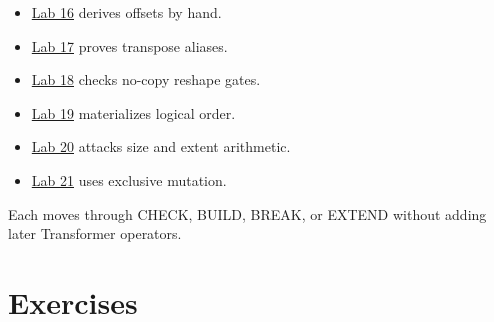 \begin{itemize}
\tightlist
\item
  \href{https://github.com/hermonai/inside-the-llm-engine/blob/astra-visual-rewrite/labs/lab-16-offset-by-hand.md}{Lab
  16} derives offsets by hand.
\item
  \href{https://github.com/hermonai/inside-the-llm-engine/blob/astra-visual-rewrite/labs/lab-17-transpose-without-copy.md}{Lab
  17} proves transpose aliases.
\item
  \href{https://github.com/hermonai/inside-the-llm-engine/blob/astra-visual-rewrite/labs/lab-18-reshape-view.md}{Lab
  18} checks no-copy reshape gates.
\item
  \href{https://github.com/hermonai/inside-the-llm-engine/blob/astra-visual-rewrite/labs/lab-19-non-contiguous-copy.md}{Lab
  19} materializes logical order.
\item
  \href{https://github.com/hermonai/inside-the-llm-engine/blob/astra-visual-rewrite/labs/lab-20-break-shape-arithmetic.md}{Lab
  20} attacks size and extent arithmetic.
\item
  \href{https://github.com/hermonai/inside-the-llm-engine/blob/astra-visual-rewrite/labs/lab-21-mutation-and-aliasing.md}{Lab
  21} uses exclusive mutation.
\end{itemize}

Each moves through CHECK, BUILD, BREAK, or EXTEND without adding later
Transformer operators.

\section{Exercises}\label{exercises-4}

